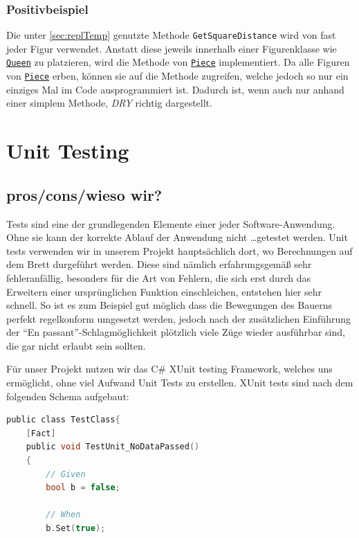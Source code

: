 \documentclass[
10pt, %
a4paper, %
oneside, %
headinclude,footinclude, %
BCOR5mm, %
]{scrartcl}
\begin{document}
\begin{onehalfspace}
\subsubsection{Positivbeispiel}
Die unter \autoref{sec:replTemp} genutzte Methode \texttt{GetSquareDistance} wird von fast jeder Figur verwendet. Anstatt diese jeweils innerhalb einer Figurenklasse wie \texttt{\href{https://github.com/schmida736/Chess-AdvancedSE/blob/main/Chess-AdvancedSE/Game\%20Elements/Pieces/Queen.cs}{Queen}} zu platzieren, wird die Methode von \texttt{\href{https://github.com/schmida736/Chess-AdvancedSE/blob/main/Chess-AdvancedSE/Game\%20Elements/Pieces/Piece.cs}{Piece}} implementiert. Da alle Figuren von \texttt{\href{https://github.com/schmida736/Chess-AdvancedSE/blob/main/Chess-AdvancedSE/Game\%20Elements/Pieces/Piece.cs}{Piece}} erben, können sie auf die Methode zugreifen, welche jedoch so nur ein einziges Mal im Code ausprogrammiert ist. Dadurch ist, wenn auch nur anhand einer simplem Methode, \textit{DRY} richtig dargestellt.
\newpage
\section{Unit Testing}
\subsection{pros/cons/wieso wir?}
Tests sind eine der grundlegenden Elemente einer jeder Software-Anwendung. Ohne sie kann der korrekte Ablauf der Anwendung nicht \dots getestet werden. Unit tests verwenden wir in unserem Projekt hauptsächlich dort, wo Berechnungen auf dem Brett durgeführt werden. Diese sind nämlich erfahrungsgemäß sehr fehleranfällig, besonders für die Art von Fehlern, die sich erst durch das Erweitern einer ursprünglichen Funktion einschleichen, entstehen hier sehr schnell. So ist es zum Beispiel gut möglich dass die Bewegungen des Bauerns perfekt regelkonform umgesetzt werden, jedoch nach der zusätzlichen Einführung der \enquote{En passant}-Schlagmöglichkeit plötzlich viele Züge wieder ausführbar sind, die gar nicht erlaubt sein sollten.

Für unser Projekt nutzen wir das C\# XUnit testing Framework, welches uns ermöglicht, ohne viel Aufwand Unit Tests zu erstellen.
XUnit tests sind nach dem folgenden Schema aufgebaut:
\begin{lstlisting}[language=c, style=mStyle]
public class TestClass{
	[Fact]
	public void TestUnit_NoDataPassed()
	{
		// Given
		bool b = false;

		// When
		b.Set(true);


\end{lstlisting}
\end{onehalfspace}
\end{document}

